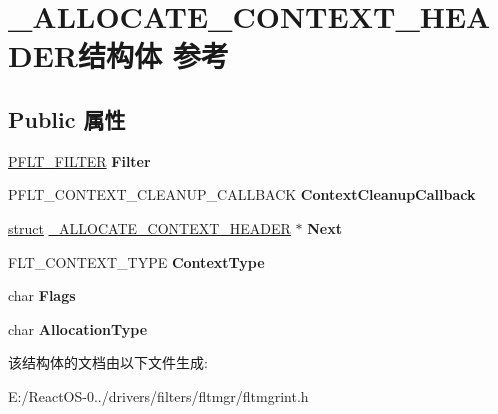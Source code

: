 \hypertarget{struct___a_l_l_o_c_a_t_e___c_o_n_t_e_x_t___h_e_a_d_e_r}{}\section{\+\_\+\+A\+L\+L\+O\+C\+A\+T\+E\+\_\+\+C\+O\+N\+T\+E\+X\+T\+\_\+\+H\+E\+A\+D\+E\+R结构体 参考}
\label{struct___a_l_l_o_c_a_t_e___c_o_n_t_e_x_t___h_e_a_d_e_r}
\subsection*{Public 属性}
\begin{DoxyCompactItemize}
\item 
\mbox{\label{struct___a_l_l_o_c_a_t_e___c_o_n_t_e_x_t___h_e_a_d_e_r_afe19c8f57674d2eced53c31c4a08e522}} 
\hyperlink{struct___f_l_t___f_i_l_t_e_r}{P\+F\+L\+T\+\_\+\+F\+I\+L\+T\+ER} {\bfseries Filter}
\item 
\mbox{\label{struct___a_l_l_o_c_a_t_e___c_o_n_t_e_x_t___h_e_a_d_e_r_ad747ce55c12fbb09f4870b2e68dc40f9}} 
P\+F\+L\+T\+\_\+\+C\+O\+N\+T\+E\+X\+T\+\_\+\+C\+L\+E\+A\+N\+U\+P\+\_\+\+C\+A\+L\+L\+B\+A\+CK {\bfseries Context\+Cleanup\+Callback}
\item 
\mbox{\label{struct___a_l_l_o_c_a_t_e___c_o_n_t_e_x_t___h_e_a_d_e_r_ac62b444aba5238ceb49da5ff5f4d02de}} 
\hyperlink{interfacestruct}{struct} \hyperlink{struct___a_l_l_o_c_a_t_e___c_o_n_t_e_x_t___h_e_a_d_e_r}{\+\_\+\+A\+L\+L\+O\+C\+A\+T\+E\+\_\+\+C\+O\+N\+T\+E\+X\+T\+\_\+\+H\+E\+A\+D\+ER} $\ast$ {\bfseries Next}
\item 
\mbox{\label{struct___a_l_l_o_c_a_t_e___c_o_n_t_e_x_t___h_e_a_d_e_r_a0c7c5f8236d80f9341942bc43ea54157}} 
F\+L\+T\+\_\+\+C\+O\+N\+T\+E\+X\+T\+\_\+\+T\+Y\+PE {\bfseries Context\+Type}
\item 
\mbox{\label{struct___a_l_l_o_c_a_t_e___c_o_n_t_e_x_t___h_e_a_d_e_r_a0ecd141824560345384bbe29cd4ad09d}} 
char {\bfseries Flags}
\item 
\mbox{\label{struct___a_l_l_o_c_a_t_e___c_o_n_t_e_x_t___h_e_a_d_e_r_abfa30439cab28131e26f9f0b7fa5280c}} 
char {\bfseries Allocation\+Type}
\end{DoxyCompactItemize}


该结构体的文档由以下文件生成\+:\begin{DoxyCompactItemize}
\item 
E\+:/\+React\+O\+S-\/0../drivers/filters/fltmgr/fltmgrint.\+h\end{DoxyCompactItemize}
